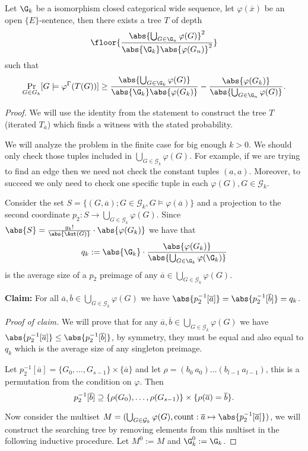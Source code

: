 \begin{lemm}
Let $\G_k$ be a isomorphism closed categorical wide sequence, let $\varphi(\overline x)$ be an open $\{E\}$-sentence, then there exists a tree $T$ of depth
\[\floor{\frac{\abs{\bigcup_{G\in\G_n}\varphi(G)}^2}{\abs{\G_k}\abs{\varphi(G_n)}^2}}\]
such that
\[\Pr_{G\in G_k}[G\models \varphi^{\Gamma}(T(G))]\geq \frac{\abs{\bigcup_{G\in\G_k}\varphi(G)}}{\abs{\G_k}\abs{\varphi(G_k)}}-\frac{\abs{\varphi(G_k)}}{\abs{\bigcup_{G\in\G_n}\varphi(G)}}.\]
\end{lemm}
\begin{proof}
We will use the identity from the statement to construct the tree $T$ (iterated $T_{\overline a}$) which finds a witness with the stated probability.

We will analyze the problem in the finite case for big enough $k>0$. We should only check those tuples included in $\bigcup_{G\in\mathcal{G}_k}\varphi(G)$. For example, if we are trying to find an edge then we need not check the constant tuples $(a,a)$. Moreover, to succeed we only need to check one specific tuple in each $\varphi(G),G\in\mathcal{G}_k$.

Consider the set $S=\{(G,\overline a); G\in \mathcal{G}_k, G\models\varphi(\overline a)\}$ and a projection to the second coordinate $p_2: S\to\bigcup_{G\in\mathcal{G}_k}\varphi(G)$. Since $\abs{S}=\frac{g_k!}{\abs{\Aut(G)}}\cdot\abs{\varphi(G_k)}$ we have that 
\[q_k:=\abs{\G_k}\cdot \frac{\abs{\varphi(G_k)}}{\abs{\bigcup_{G\in\G_k}\varphi(\G_k)}}\] 
is the average size of a $p_2$ preimage of any $\overline a\in \bigcup_{G\in\mathcal{G}_k}\varphi(G)$. 

\textbf{Claim:} For all $\overline a,\overline b\in\bigcup_{G\in\mathcal{G}_k}\varphi(G)$ we have $\abs{p_2^{-1}[\overline a]}=\abs{p_2^{-1}[\overline b]}=q_k$.

\textit{Proof of claim.} We will prove that for any $\overline a,\overline b\in\bigcup_{G\in\mathcal{G}_k}\varphi(G)$ we have $\abs{p_2^{-1}[\overline a]}\leq\abs{p_2^{-1}[\overline b]}$, by symmetry, they must be equal and also equal to $q_k$ which is the average size of any singleton preimage.

Let $p_2^{-1}[\overline a]=\{G_0,\dots,G_{s-1}\}\times\{\overline a\}$ and let $\rho=(b_0\: a_0)\dots(b_{l-1}\:a_{l-1})$, this is a permutation from the condition on $\varphi$. Then \[p_2^{-1}[\overline b]\supseteq\{\rho(G_0),\dots,\rho(G_{s-1})\}\times\{\rho(\overline a)=\overline b\}.\qedhere\] 

Now consider the multiset $M=(\bigcup_{G\in\mathcal{G}_k}\varphi(G),\text{count}:\overline a \mapsto \abs{p_2^{-1}[\overline a]})$, we will construct the searching tree by removing elements from this multiset in the following inductive procedure. Let $M^{0}:=M$ and $\G_k^{0}:=\G_k$.


\end{proof}
